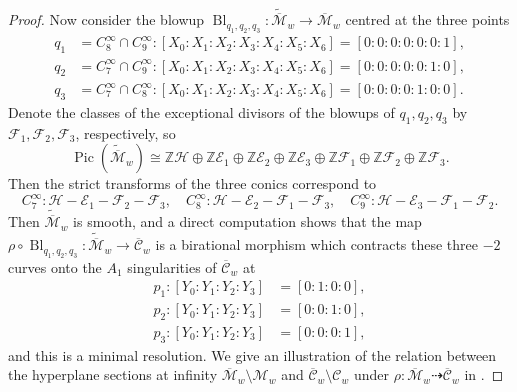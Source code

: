 \documentclass[a4paper,reqno]{amsart}
\numberwithin{equation}{section}
\newcommand{\Z}{\mathbb{Z}}
\newcommand{\Pic}{\operatorname{Pic}}
\numberwithin{equation}{section}
\begin{document}
\begin{proof}
        Now consider the blowup $\operatorname{Bl}_{q_1,q_2,q_3} : \widetilde{\overline{\mathcal{M}}}_w \to \overline{\mathcal{M}}_w$ 
        centred at the three points 
\begin{align*}
    q_1 &= C^{\infty}_8\cap C^{\infty}_9: [X_0:X_1:X_2:X_3:X_4:X_5:X_6]=[0:0:0:0:0:0:1],   \\ 
    q_2 &= C^{\infty}_7\cap C^{\infty}_9: [X_0:X_1:X_2:X_3:X_4:X_5:X_6]=[0:0:0:0:0:1:0],  \\ 
    q_3 &= C^{\infty}_7\cap C^{\infty}_8: [X_0:X_1:X_2:X_3:X_4:X_5:X_6]=[0:0:0:0:1:0:0].   
\end{align*}
Denote the classes of the exceptional divisors of the blowups of $q_1,q_2,q_3$ by $\mathcal{F}_1,\mathcal{F}_2,\mathcal{F}_3$, respectively, so 
$$\Pic( \widetilde{\overline{\mathcal{M}}}_w) \cong \Z\mathcal{H}\oplus \Z \mathcal{E}_1\oplus\Z\mathcal{E}_2\oplus \Z \mathcal{E}_3\oplus \Z \mathcal{F}_1\oplus \Z \mathcal{F}_2\oplus \Z \mathcal{F}_3.$$
Then the strict transforms of the three conics correspond to 
$$C^{\infty}_7 : \mathcal{H}-\mathcal{E}_1-\mathcal{F}_2-\mathcal{F}_3, \quad
C^{\infty}_8 : \mathcal{H}-\mathcal{E}_2-\mathcal{F}_1-\mathcal{F}_3, \quad
C^{\infty}_9 : \mathcal{H}-\mathcal{E}_3-\mathcal{F}_1-\mathcal{F}_2.$$
Then $\widetilde{\overline{\mathcal{M}}}_w$ is smooth, and a direct computation shows that the map $\rho\circ \operatorname{Bl}_{q_1,q_2,q_3} : \widetilde{\overline{\mathcal{M}}}_w \rightarrow \overline{\mathcal{C}}_w$ is a birational morphism which contracts these three $-2$ curves onto the $A_1$ singularities of $\overline{\mathcal{C}}_w$ at 
\begin{align*}
    p_1 : [Y_0:Y_1:Y_2:Y_3] &= [0:1:0:0], \\
p_2 : [Y_0:Y_1:Y_2:Y_3] &= [0:0:1:0], \\
p_3 : [Y_0:Y_1:Y_2:Y_3] &= [0:0:0:1],
\end{align*}
and this is a minimal resolution. 
We give an illustration of the relation between the hyperplane sections at infinity $\overline{\mathcal{M}}_w\setminus \mathcal{M}_w$ and $\overline{\mathcal{C}}_w\setminus\mathcal{C}_w$ under $\rho : \overline{\mathcal{M}}_w \dashrightarrow \overline{\mathcal{C}}_w$ in . \end{proof}
\end{document}
